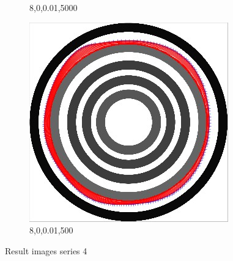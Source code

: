 \documentclass[paper=a4, fontsize=11pt]{scrartcl} %
\numberwithin{equation}{section} %
\numberwithin{figure}{section} %
\numberwithin{table}{section} %
\begin{document}
\begin{figure}[H]
\begin{subfigure}[b]{0.2\textwidth}
                \caption{8,0,0.01,5000}
                \label{fig:Gestaltcircle6}
        \end{subfigure}
         \begin{subfigure}[b]{0.2\textwidth}
                \includegraphics[width=\textwidth]{401}
                \caption{8,0,0.01,500}
                \label{fig:Manycircles1}
        \end{subfigure}
        \caption{Result images series 4 }\label{fig:animals}
\end{figure}
\end{document}
